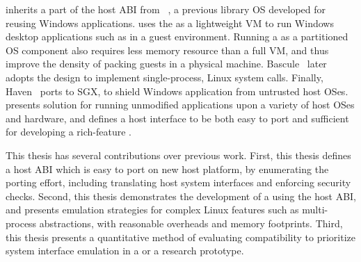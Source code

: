 \graphene{} inherits 
a part of the host ABI from \drawbridge{}~\cite{porter11drawbridge},
a previous library OS developed for reusing 
Windows applications.
\drawbridge{} uses the \libos{} as a lightweight VM
to run Windows desktop applications such as in a guest environment.
Running a \libos{} as a partitioned OS component also requires
less memory resource than a full VM,
and thus improve the density of packing guests in a physical machine.
Bascule~\cite{baumann13bascule} later adopts the design
to implement single-process, Linux system calls.
Finally, Haven~\cite{baumann14haven} ports \drawbridge{} to SGX, to shield Windows application from untrusted host OSes.
\graphene{} %
presents solution for running unmodified applications
upon a variety of host OSes and hardware,
and defines a host interface to be both easy to port and sufficient
for developing a rich-feature \libos{}.



This thesis has several contributions over previous work.
First, this thesis
defines a host ABI which is easy to port
on new host platform,
by enumerating the porting effort, including translating host system interfaces and enforcing security checks.
Second,
this thesis demonstrates the development
of a \libos{}
using the host ABI,
and presents emulation strategies
for complex Linux features such as multi-process abstractions,
with reasonable overheads and memory footprints.
Third,
this thesis presents a quantitative method of evaluating compatibility
to prioritize system interface emulation
in a \libos{} or a research prototype.
 



